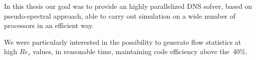 In this thesis our goal was to provide an highly parallelized DNS solver, based on pseudo-spectral approach, able to carry out simulation on a wide number of processors in an efficient way. \par
We were particularly interested in the possibility to generate flow statistics at high $Re_{\tau}$ values, in reasonable time, maintaining code efficiency above the~40\%. \\~\par




  




  